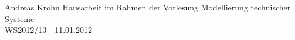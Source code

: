 
\date{\today}


{Andreas Krohn} %
{Hausarbeit im Rahmen der Vorlesung Modellierung technischer Systeme\\
WS2012/13 - 11.01.2012} %

% 

\tableofcontents %









